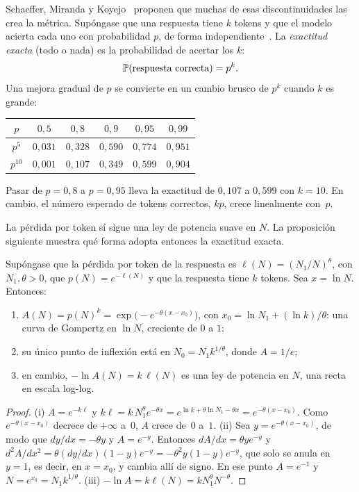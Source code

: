 Schaeffer, Miranda y Koyejo~\cite{schaeffer} proponen que muchas de esas discontinuidades las crea la métrica. Supóngase que una respuesta tiene $k$ tokens y que el modelo acierta cada uno con probabilidad $p$, de forma independiente~\cite[§1.5]{bt}. La \emph{exactitud exacta} (todo o nada) es la probabilidad de acertar los $k$:
\[
\mathbb{P}(\text{respuesta correcta})=p^{k}.
\]
Una mejora gradual de $p$ se convierte en un cambio brusco de $p^{k}$ cuando $k$ es grande:
\begin{center}\small
\begin{tabular}{@{}cccccc@{}}
\toprule
$p$ & $0{,}5$ & $0{,}8$ & $0{,}9$ & $0{,}95$ & $0{,}99$ \\
\midrule
$p^{5}$ & $0{,}031$ & $0{,}328$ & $0{,}590$ & $0{,}774$ & $0{,}951$ \\
$p^{10}$ & $0{,}001$ & $0{,}107$ & $0{,}349$ & $0{,}599$ & $0{,}904$ \\
\bottomrule
\end{tabular}
\end{center}
Pasar de $p=0{,}8$ a $p=0{,}95$ lleva la exactitud de $0{,}107$ a $0{,}599$ con $k=10$. En cambio, el número esperado de tokens correctos, $kp$, crece linealmente con~$p$.

La pérdida por token sí sigue una ley de potencia suave en $N$. La proposición siguiente muestra qué forma adopta entonces la exactitud exacta.

\begin{proposicion}\label{prop:gompertz}
Supóngase que la pérdida por token de la respuesta es $\ell(N)=(N_1/N)^{\theta}$, con $N_1,\theta>0$, que $p(N)=e^{-\ell(N)}$ y que la respuesta tiene $k$ tokens. Sea $x=\ln N$. Entonces:
\begin{enumerate}
  \item $A(N)=p(N)^{k}=\exp\bigl(-e^{-\theta(x-x_0)}\bigr)$, con $x_0=\ln N_1+(\ln k)/\theta$: una curva de Gompertz en $\ln N$, creciente de $0$ a $1$;
  \item su único punto de inflexión está en $N_0=N_1k^{1/\theta}$, donde $A=1/e$;
  \item en cambio, $-\ln A(N)=k\,\ell(N)$ es una ley de potencia en $N$, una recta en escala log-log.
\end{enumerate}
\end{proposicion}

\begin{proof}
(i) $A=e^{-k\ell}$ y $k\ell=k\,N_1^{\theta}e^{-\theta x}=e^{\ln k+\theta\ln N_1-\theta x}=e^{-\theta(x-x_0)}$. Como $e^{-\theta(x-x_0)}$ decrece de $+\infty$ a~$0$, $A$ crece de~$0$ a~$1$. (ii) Sea $y=e^{-\theta(x-x_0)}$, de modo que $dy/dx=-\theta y$ y $A=e^{-y}$. Entonces $dA/dx=\theta ye^{-y}$ y $d^{2}A/dx^{2}=\theta(dy/dx)(1-y)e^{-y}=-\theta^{2}y(1-y)e^{-y}$, que solo se anula en $y=1$, es decir, en $x=x_0$, y cambia allí de signo. En ese punto $A=e^{-1}$ y $N=e^{x_0}=N_1k^{1/\theta}$. (iii) $-\ln A=k\ell(N)=kN_1^{\theta}N^{-\theta}$.
\end{proof}

